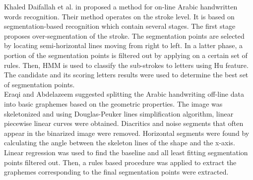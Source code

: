 \documentclass[journal,compsoc]{IEEEtran}
\begin{document}
Khaled Daifallah et al. in \cite{daifallah2009recognition} proposed a method for on-line Arabic handwritten words recognition. Their method operates on the stroke level. It is based on segmentation-based recognition which contain several stages. The first stage proposes over-segmentation of the stroke. The segmentation points are selected by locating semi-horizontal lines moving from right to left. In a latter phase, a portion of the segmentation points is filtered out by applying on a certain set of rules. Then, HMM is used to classify the sub-strokes to letters using Hu feature. The candidate and its scoring letters results were used to determine the best set of segmentation points. \\

Eraqi and Abdelazeem \cite{eraqi2012new} suggested splitting the Arabic handwriting off-line data into basic graphemes based on the geometric properties. The image was skeletonized and using Douglas-Peuker lines simplification algorithm, linear piecewise linear curves were obtained. Diacritics and noise segments that often appear in the binarized image were removed. Horizontal segments were found by calculating the angle between the skeleton lines of the shape and the x-axis. Linear regression was used to find the baseline and all least fitting segmentation points filtered out. Then, a rules based procedure was applied to extract the graphemes corresponding to the final segmentation points were extracted.    
\end{document}
